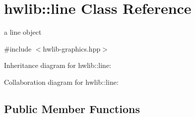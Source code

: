 \hypertarget{classhwlib_1_1line}{}\section{hwlib\+:\+:line Class Reference}
\label{classhwlib_1_1line}


a line object  




{\ttfamily \#include $<$hwlib-\/graphics.\+hpp$>$}



Inheritance diagram for hwlib\+:\+:line\+:


Collaboration diagram for hwlib\+:\+:line\+:
\subsection*{Public Member Functions}
